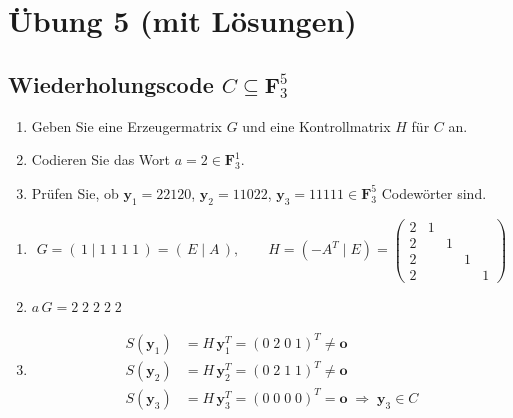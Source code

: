 \section{Übung 5 (mit Lösungen)}

\subsection{Wiederholungscode $C \subseteq \mathbf{F}_3^5$}

\begin{aufgabe}[5\_1]
\begin{enumerate}[label=\alph*)]
\item Geben Sie eine Erzeugermatrix $G$ und eine Kontrollmatrix $H$ für $C$ an.
\item Codieren Sie das Wort $a = 2 \in \mathbf{F}_3^1$.
\item Prüfen Sie, ob $\mathbf{y}_1 = 22120$, $\mathbf{y}_2 = 11022$, $\mathbf{y}_3 = 11111 \in \mathbf{F}_3^5$ Codewörter sind.
\end{enumerate}
\end{aufgabe}

\begin{loesung}
\begin{enumerate}[label=\alph*)]
\item
\[
G = (\,1 \mid 1\;1\;1\;1\,) = (\,E \mid A\,), \qquad
H = (-A^T \mid E) =
\begin{pmatrix}
2 & 1 & & & \\
2 & & 1 & & \\
2 & & & 1 & \\
2 & & & & 1
\end{pmatrix}
\]
\item $a\,G = 2\;2\;2\;2\;2$
\item
\begin{align*}
S(\mathbf{y}_1) &= H\,\mathbf{y}_1^T = (0\;2\;0\;1)^T \ne \mathbf{o}\\
S(\mathbf{y}_2) &= H\,\mathbf{y}_2^T = (0\;2\;1\;1)^T \ne \mathbf{o}\\
S(\mathbf{y}_3) &= H\,\mathbf{y}_3^T = (0\;0\;0\;0)^T = \mathbf{o} \;\Rightarrow\; \mathbf{y}_3 \in C
\end{align*}
\end{enumerate}
\end{loesung}


